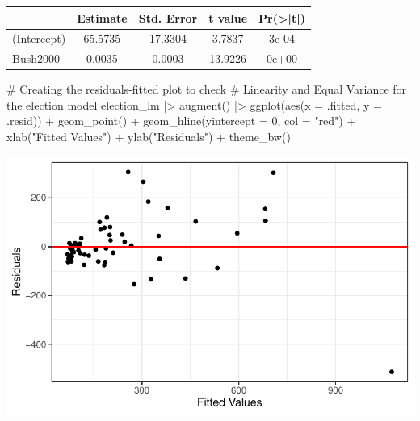 \documentclass[
  letterpaper,
  DIV=11,
  numbers=noendperiod]{scrartcl}
\newenvironment{Shaded}{\begin{snugshade}}{\end{snugshade}}
\newcommand{\AttributeTok}[1]{\textcolor[rgb]{0.40,0.45,0.13}{#1}}
\newcommand{\CommentTok}[1]{\textcolor[rgb]{0.37,0.37,0.37}{#1}}
\newcommand{\DecValTok}[1]{\textcolor[rgb]{0.68,0.00,0.00}{#1}}
\newcommand{\FunctionTok}[1]{\textcolor[rgb]{0.28,0.35,0.67}{#1}}
\newcommand{\NormalTok}[1]{\textcolor[rgb]{0.00,0.23,0.31}{#1}}
\newcommand{\SpecialCharTok}[1]{\textcolor[rgb]{0.37,0.37,0.37}{#1}}
\newcommand{\StringTok}[1]{\textcolor[rgb]{0.13,0.47,0.30}{#1}}
\begin{document}
\begin{table}[H]
\centering
\begin{tabular}[t]{lcccc}
\toprule
  & Estimate & Std. Error & t value & Pr(>|t|)\\
\midrule
(Intercept) & 65.5735 & 17.3304 & 3.7837 & 3e-04\\
Bush2000 & 0.0035 & 0.0003 & 13.9226 & 0e+00\\
\bottomrule
\end{tabular}
\end{table}

\begin{Shaded}
\begin{Highlighting}[]
\CommentTok{\# Creating the residuals{-}fitted plot to check }
\CommentTok{\# Linearity and Equal Variance for the election model}
\NormalTok{election\_lm }\SpecialCharTok{|\textgreater{}}
  \FunctionTok{augment}\NormalTok{() }\SpecialCharTok{|\textgreater{}}
  \FunctionTok{ggplot}\NormalTok{(}\FunctionTok{aes}\NormalTok{(}\AttributeTok{x =}\NormalTok{ .fitted, }\AttributeTok{y =}\NormalTok{ .resid)) }\SpecialCharTok{+}
  \FunctionTok{geom\_point}\NormalTok{() }\SpecialCharTok{+}
  \FunctionTok{geom\_hline}\NormalTok{(}\AttributeTok{yintercept =} \DecValTok{0}\NormalTok{, }\AttributeTok{col =} \StringTok{"red"}\NormalTok{) }\SpecialCharTok{+}
  \FunctionTok{xlab}\NormalTok{(}\StringTok{"Fitted Values"}\NormalTok{) }\SpecialCharTok{+}
  \FunctionTok{ylab}\NormalTok{(}\StringTok{"Residuals"}\NormalTok{) }\SpecialCharTok{+}
  \FunctionTok{theme\_bw}\NormalTok{()}
\end{Highlighting}
\end{Shaded}

\includegraphics{SDS-291-case-study-1_files/figure-pdf/unnamed-chunk-4-2.pdf}
\end{document}
